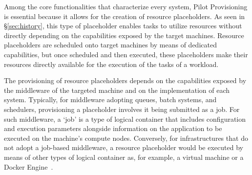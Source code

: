 \documentclass{sig-alternate}
\begin{document}
Among the core functionalities that characterize every \pilotjob system, Pilot
Provisioning is essential because it allows for the creation of resource
placeholders. As seen in \S\ref{sec:history}, this type of placeholder enables
tasks to utilize resources without directly depending on the capabilities
exposed by the target machines. Resource placeholders are scheduled onto target
machines by means of dedicated capabilities, but once scheduled and then
executed, these placeholders make their resources directly available for the
execution of the tasks of a workload.




The provisioning of resource placeholders depends on the capabilities exposed by
the middleware of the targeted machine and on the implementation of each \pilot
system. Typically, for middleware adopting queues, batch systems, and
schedulers, provisioning a placeholder involves it being submitted as a job. For
such middleware, a `job' is a type of logical container that includes
configuration and execution parameters alongside information on the application
to be executed on the machine's compute nodes. Conversely, for infrastructures
that do not adopt a job-based middleware, a resource placeholder would be
executed by means of other types of logical container as, for example, a virtual
machine or a Docker Engine~\cite{bernstein2014,felter2014}.
\end{document}
